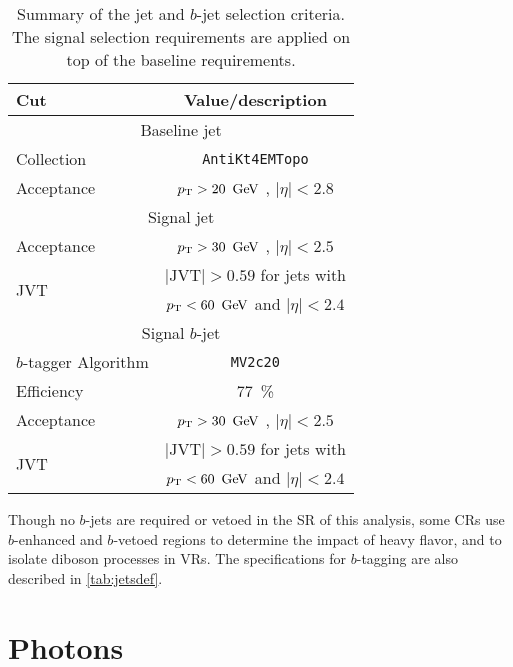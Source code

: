 \begin{table}[bh!]
\begin{center}
    \begin{tabular}{l|c}
      \hline
      Cut            & Value/description \\
      \hline
      \hline
      \multicolumn{2}{c}{Baseline jet} \\
      \hline
      Collection     & \texttt{AntiKt4EMTopo} \\
      Acceptance     & $\pt > 20\,\GeV$ , $|\eta |<2.8$ \\
      \hline
      \multicolumn{2}{c}{Signal jet} \\
      \hline
      Acceptance     & $\pt > 30\,\GeV$ , $|\eta | < 2.5$ \\ 
      \multirow{2}{*}{JVT}      & $|\mathrm{JVT}|>0.59$ for jets with \\
                                & $\pt <60\,\GeV$ and $|\eta | < 2.4$ \\
      \hline
      \multicolumn{2}{c}{Signal $b$-jet} \\
      \hline 
      $b$-tagger Algorithm      & \texttt{MV2c20} \\
      Efficiency                & $77$~\% \\
      Acceptance                & $\pt > 30\,\GeV$ , $|\eta | < 2.5$ \\ 
      \multirow{2}{*}{JVT}      & $|\mathrm{JVT}|>0.59$ for jets with \\
                                & $\pt <60\,\GeV$ and $|\eta | < 2.4$ \\
      \hline
      \hline
\end{tabular}
\end{center}
\caption{Summary of the jet and $b$-jet selection criteria. The signal selection
  requirements are applied on top of the baseline requirements. }
\label{tab:jetsdef}
\end{table}

Though no $b$-jets are required or vetoed in the \ac{SR} of this analysis, some \acp{CR} use $b$-enhanced and $b$-vetoed regions to determine the impact of heavy flavor, and to isolate diboson processes in \acp{VR}. The specifications for $b$-tagging are also described in \autoref{tab:jetsdef}.

\section{Photons}

